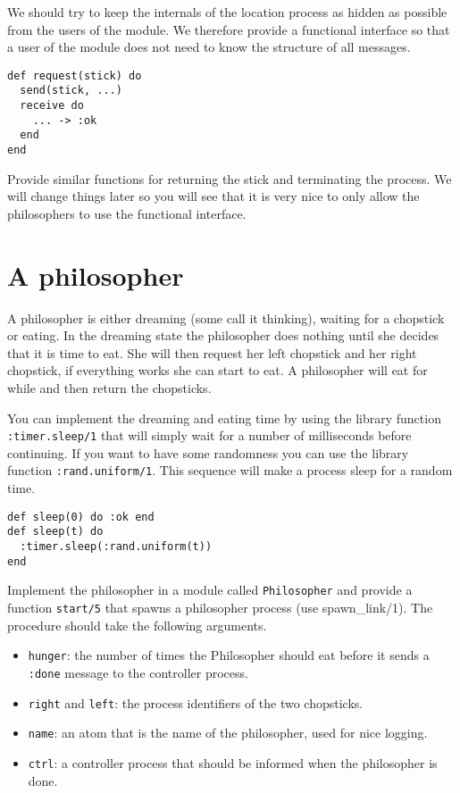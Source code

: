 \documentclass[a4paper,11pt]{article}
\begin{document}
We should try to keep the internals of the location process as hidden
as possible from the users of the module. We therefore provide a
functional interface so that a user of the module does not need to
know the structure of all messages.

\begin{verbatim}
def request(stick) do
  send(stick, ...)
  receive do
    ... -> :ok
  end
end
\end{verbatim}

Provide similar functions for returning the stick and terminating the
process. We will change things later so you will see that it is very
nice to only allow the philosophers to use the functional interface.



\section{A philosopher}

A philosopher is either dreaming (some call it thinking), waiting for
a chopstick or eating. In the dreaming state the philosopher does
nothing until she decides that it is time to eat. She will then
request her left chopstick and her right chopstick, if everything
works she can start to eat. A philosopher will eat for while and then
return the chopsticks.

You can implement the dreaming and eating time by using the library
function {\tt :timer.sleep/1} that will simply wait for a number of
milliseconds before continuing. If you want to have some randomness
you can use the library function {\tt :rand.uniform/1}. This sequence
will make a process sleep for a random time.

\begin{verbatim}
def sleep(0) do :ok end
def sleep(t) do 
  :timer.sleep(:rand.uniform(t))
end
\end{verbatim}

Implement the philosopher in a module called {\tt Philosopher} and
provide a function {\tt start/5} that spawns a philosopher
process (use spawn\_link/1). The procedure should take the following arguments.

\begin{itemize}

\item {\tt hunger}: the number of times the Philosopher should eat
  before it sends a {\tt :done} message to the controller process.

\item {\tt right} and {\tt left}: the process identifiers of the two
  chopsticks.

\item {\tt name}: an atom that is the name of the philosopher, used
  for nice logging.

\item {\tt ctrl}: a controller process that should be informed when
  the philosopher is done.
\end{itemize}
\end{document}
